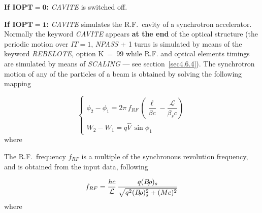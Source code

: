 \noindent\textbf{If $\mathbf{IOPT  =  0}$:}   \textsl{CAVITE} is switched off.  
\bigskip

\noindent\textbf{If $\mathbf{IOPT  =  1}$:}  \textsl{CAVITE} simulates the R.F.~cavity of a 
synchrotron 
accelerator. Normally the keyword \textsl{CAVITE} appears \textbf{at the end} of the optical 
structure (the periodic motion over $IT  = 1$, \textsl{NPASS} + 1 
turns is simulated by means of the keyword \textsl{REBELOTE}, option 
\mbox{K  =  99} while  R.F.  and optical elements  timings are simulated by means of
\textsl{SCALING} --- see section~\ref{sec4.6.4}). The synchrotron motion of any of the 
\IMAX{} particles of a beam is obtained by solving the following mapping 

$$ \left\{ 
\begin{array}{l}
	\phi_ 2-\phi_ 1= 2\pi \, f_{RF}\, 
	     \left(  \dfrac{\ell}{ \beta c} - \dfrac{\mathcal{L} }{ \beta_sc} \right) \\
	W_2-W_1 = q\hat  V\, \sin\phi_ 1  
\end{array}
\right. $$
%
 where
  
{\renewcommand{\arraystretch}{1}
 }
\bigskip

\noindent The R.F.\ frequency $ f_{RF} $ is a multiple of the synchronous 
revolution frequency, and is obtained from the input data, following 

$$ f_{RF} = \frac{hc }{\mathcal{L}}\, \frac{q(B\!\rho )_s }{ \sqrt{q^2(B\!\rho)^2_s+(Mc)^2}} $$
%
 where
  
